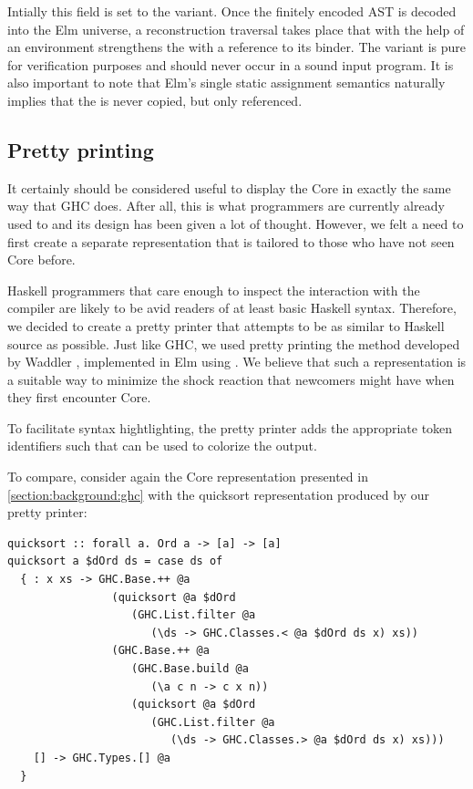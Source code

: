Intially this field is set to the  variant. Once the finitely encoded AST is decoded into the 
Elm universe, a reconstruction traversal takes place that with the help of an environment strengthens the 
 with a reference to its binder. The  variant is pure for verification purposes
and should never occur in a sound input program. It is also important to note that Elm's single static assignment
semantics naturally implies that the  is never copied, but only referenced.


\subsection{Pretty printing}

It certainly should be considered useful to display the Core in exactly the same way that
GHC does. After all, this is what programmers are currently already used to and its design
has been given a lot of thought. However, we felt a need to first create a separate representation
that is tailored to those who have not seen Core before.

Haskell programmers that care enough to inspect the interaction with the compiler are likely to be
avid readers of at least basic Haskell syntax. Therefore, we decided to create a pretty printer that attempts
to be as similar to Haskell source as possible. Just like GHC, we used pretty printing the method developed 
by Waddler \cite{prettier_printer}, implemented in Elm using  \cite{prettier_printer_elm}.
We believe that such a representation is a suitable way to minimize the shock reaction that newcomers might have
when they first encounter Core.

To facilitate syntax hightlighting, the pretty printer adds the appropriate token identifiers such that 
 \cite{pygments} can be used to colorize the output.

To compare, consider again the Core representation presented in \cref{section:background:ghc} with the quicksort
representation produced by our pretty printer:

\begin{listing}[H]
\begin{verbatim}
quicksort :: forall a. Ord a -> [a] -> [a]
quicksort a $dOrd ds = case ds of
  { : x xs -> GHC.Base.++ @a
                (quicksort @a $dOrd
                   (GHC.List.filter @a
                      (\ds -> GHC.Classes.< @a $dOrd ds x) xs))
                (GHC.Base.++ @a
                   (GHC.Base.build @a
                      (\a c n -> c x n))
                   (quicksort @a $dOrd
                      (GHC.List.filter @a
                         (\ds -> GHC.Classes.> @a $dOrd ds x) xs)))
    [] -> GHC.Types.[] @a
  }
\end{verbatim}
\end{listing}

